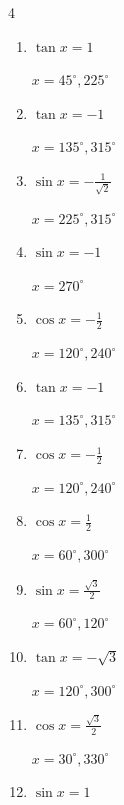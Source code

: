 \begin{multicols}{4}
\begin{enumerate}
        $\displaystyle x = 150^{\circ} , 210^{\circ}$

  \item $\displaystyle \tan{x}  = 1$

        $\displaystyle x = 45^{\circ} , 225^{\circ}$

  \item $\displaystyle \tan{x}  = -1$

        $\displaystyle x = 135^{\circ} , 315^{\circ}$

  \item $\displaystyle \sin{x}  = -\frac{1}{\sqrt{2}}$

        $\displaystyle x = 225^{\circ} , 315^{\circ}$

  \item $\displaystyle \sin{x}  = -1$

        $\displaystyle x = 270^{\circ}$

  \item $\displaystyle \cos{x}  = -\frac{1}{2}$

        $\displaystyle x = 120^{\circ} , 240^{\circ}$

\columnbreak %

  \item $\displaystyle \tan{x}  = -1$

        $\displaystyle x = 135^{\circ} , 315^{\circ}$

  \item $\displaystyle \cos{x}  = -\frac{1}{2}$

        $\displaystyle x = 120^{\circ} , 240^{\circ}$

  \item $\displaystyle \cos{x}  = \frac{1}{2}$

        $\displaystyle x = 60^{\circ} , 300^{\circ}$

  \item $\displaystyle \sin{x}  = \frac{\sqrt{3}}{2}$

        $\displaystyle x = 60^{\circ} , 120^{\circ}$

  \item $\displaystyle \tan{x}  = -\sqrt{3}$

        $\displaystyle x = 120^{\circ} , 300^{\circ}$

  \item $\displaystyle \cos{x}  = \frac{\sqrt{3}}{2}$

        $\displaystyle x = 30^{\circ} , 330^{\circ}$

  \item $\displaystyle \sin{x}  = 1$


\end{enumerate}
\end{multicols}
